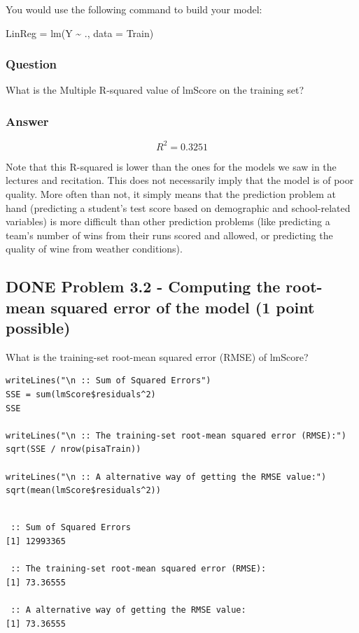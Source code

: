 \documentclass[letterpaper, 9pt, onecolumn, twoside, technote, final]{IEEEtran}
\begin{document}
You would use the following command to build your model:

LinReg = lm(Y \textasciitilde{} ., data = Train)

\subsubsection{Question}
\label{sec-2-8-1}

What is the Multiple R-squared value of lmScore on the training set?

\subsubsection{Answer}
\label{sec-2-8-2}

$$R^2 = 0.3251$$

Note that this R-squared is lower than the ones for the models we saw
in the lectures and recitation. This does not necessarily imply that
the model is of poor quality. More often than not, it simply means
that the prediction problem at hand (predicting a student's test score
based on demographic and school-related variables) is more difficult
than other prediction problems (like predicting a team's number of
wins from their runs scored and allowed, or predicting the quality of
wine from weather conditions).

\subsection{{\bfseries\sffamily DONE} Problem 3.2 - Computing the root-mean squared error of the model (1 point possible)}
\label{sec-2-9}
What is the training-set root-mean squared error (RMSE) of lmScore?

\begin{verbatim}
writeLines("\n :: Sum of Squared Errors")
SSE = sum(lmScore$residuals^2)
SSE

writeLines("\n :: The training-set root-mean squared error (RMSE):")
sqrt(SSE / nrow(pisaTrain))

writeLines("\n :: A alternative way of getting the RMSE value:")
sqrt(mean(lmScore$residuals^2))
\end{verbatim}

\begin{verbatim}

 :: Sum of Squared Errors
[1] 12993365

 :: The training-set root-mean squared error (RMSE):
[1] 73.36555

 :: A alternative way of getting the RMSE value:
[1] 73.36555
\end{verbatim}
\end{document}
